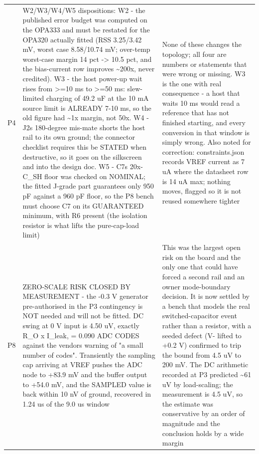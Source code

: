 \documentclass[11pt,a4paper]{article}
\begin{document}
{\begin{longtable}{lp{5.2cm}p{7.2cm}}
P4 & W2/W3/W4/W5 dispositions: W2 - the published error budget was computed on the OPA333 and must be restated for the OPA320 actually fitted (RSS 3.25/3.42 mV, worst case 8.58/10.74 mV; over-temp worst-case margin 14 pct -\textgreater{} 10.5 pct, and the bias-current row improves \textasciitilde{}200x, never credited). W3 - the host power-up wait rises from \textgreater{}=10 ms to \textgreater{}=50 ms: slew-limited charging of 49.2 uF at the 10 mA source limit is ALREADY 7-10 ms, so the old figure had \textasciitilde{}1x margin, not 50x. W4 - J2s 180-degree mis-mate shorts the host rail to its own ground; the connector checklist requires this be STATED when destructive, so it goes on the silkscreen and into the design doc. W5 - C7s 20x-C\_SH floor was checked on NOMINAL; the fitted J-grade part guarantees only 950 pF against a 960 pF floor, so the P8 bench must choose C7 on its GUARANTEED minimum, with R6 present (the isolation resistor is what lifts the pure-cap-load limit) & None of these changes the topology; all four are numbers or statements that were wrong or missing. W3 is the one with real consequence - a host that waits 10 ms would read a reference that has not finished starting, and every conversion in that window is simply wrong. Also noted for correction: constraints.json records VREF current as 7 uA where the datasheet row is 14 uA max; nothing moves, flagged so it is not reused somewhere tighter \\
P8 & ZERO-SCALE RISK CLOSED BY MEASUREMENT - the -0.3 V generator pre-authorised in the P3 contingency is NOT needed and will not be fitted. DC swing at 0 V input is 4.50 uV, exactly R\_O x I\_leak, = 0.090 ADC CODES against the vendors warning of "a small number of codes". Transiently the sampling cap arriving at VREF pushes the ADC node to +83.9 mV and the buffer output to +54.0 mV, and the SAMPLED value is back within 10 nV of ground, recovered in 1.24 us of the 9.0 us window & This was the largest open risk on the board and the only one that could have forced a second rail and an owner mode-boundary decision. It is now settled by a bench that models the real switched-capacitor event rather than a resistor, with a seeded defect (V- lifted to +0.2 V) confirmed to trip the bound from 4.5 uV to 200 mV. The DC arithmetic recorded at P3 predicted \textasciitilde{}61 uV by load-scaling; the measurement is 4.5 uV, so the estimate was conservative by an order of magnitude and the conclusion holds by a wide margin \\

\end{longtable}}
\end{document}
